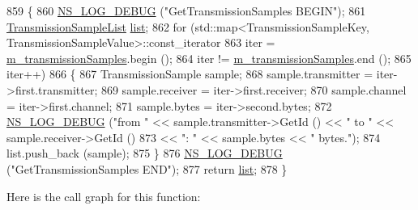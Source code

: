 \begin{DoxyCode}
859 \{
860   \hyperlink{group__logging_ga413f1886406d49f59a6a0a89b77b4d0a}{NS\_LOG\_DEBUG} (\textcolor{stringliteral}{"GetTransmissionSamples BEGIN"});
861   \hyperlink{classns3_1_1PyViz_afef07a5e33f074ff5759906b90b885fb}{TransmissionSampleList} \hyperlink{openflow-interface_8h_afd9bcfa176617760671b67580f536fa7}{list};
862   \textcolor{keywordflow}{for} (std::map<TransmissionSampleKey, TransmissionSampleValue>::const\_iterator
863        iter = \hyperlink{classns3_1_1PyViz_ab5e919d5d58fc6088fc94f5792a34225}{m\_transmissionSamples}.begin ();
864        iter !=  \hyperlink{classns3_1_1PyViz_ab5e919d5d58fc6088fc94f5792a34225}{m\_transmissionSamples}.end ();
865        iter++)
866     \{
867       TransmissionSample sample;
868       sample.transmitter = iter->first.transmitter;
869       sample.receiver = iter->first.receiver;
870       sample.channel = iter->first.channel;
871       sample.bytes = iter->second.bytes;
872       \hyperlink{group__logging_ga413f1886406d49f59a6a0a89b77b4d0a}{NS\_LOG\_DEBUG} (\textcolor{stringliteral}{"from "} << sample.transmitter->GetId () << \textcolor{stringliteral}{" to "} << sample.receiver->GetId
       ()
873                             << \textcolor{stringliteral}{": "} << sample.bytes << \textcolor{stringliteral}{" bytes."});
874       list.push\_back (sample);
875     \}
876   \hyperlink{group__logging_ga413f1886406d49f59a6a0a89b77b4d0a}{NS\_LOG\_DEBUG} (\textcolor{stringliteral}{"GetTransmissionSamples END"});
877   \textcolor{keywordflow}{return} \hyperlink{openflow-interface_8h_afd9bcfa176617760671b67580f536fa7}{list};
878 \}
\end{DoxyCode}


Here is the call graph for this function\+:


